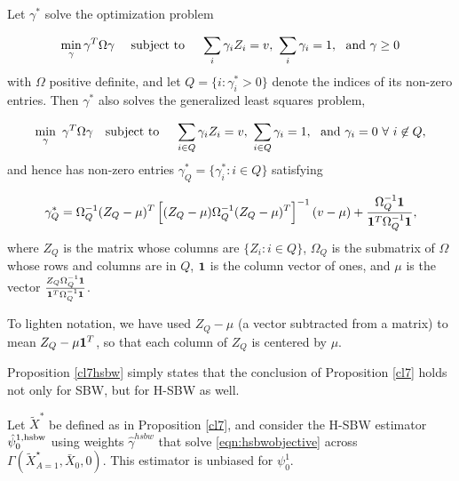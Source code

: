 \begin{proposition}\label{cl56}
Let $\gamma^*$ solve the optimization problem

\begin{equation}\label{eqn:a1.1}
 \min_\gamma \gamma^T \Omega \gamma \quad \text{ subject to } \quad  \sum_i \gamma_i Z_i = v,\ \sum_i \gamma_i = 1,\ \textup{ and } \gamma \geq 0%
\end{equation}
 with $\Omega$ positive definite, and let $Q = \{i: \gamma^*_i > 0\}$ denote the indices of its non-zero entries. Then $\gamma^*$ also solves the generalized least squares problem,
  
  \begin{equation}\label{eqn:a1.2}
   \min_{\gamma}  \ \gamma^T \Omega \gamma  \quad \textup{subject to }\quad \sum_{i \in Q} \gamma_i Z_i = v,\ \sum_{i \in Q} \gamma_i = 1,\ \textup{ and }   \gamma_i = 0\  \forall\ i \not\in Q,
  \end{equation}
 and hence has non-zero entries $\gamma^*_Q = \{\gamma_i^*: i \in Q\}$ satisfying
 
 \begin{equation}\label{eqn:a1.3}
 \gamma^*_{Q} = \Omega_{Q}^{-1} (Z_{Q} - \mu)^T\left[ (Z_Q - \mu) \Omega_{Q}^{-1} (Z_Q - \mu)^T\right]^{-1} (v - \mu) + \frac{\Omega^{-1}_Q {\bf 1} }{{\bf 1}^T \Omega^{-1}_Q {\bf 1}},
 \end{equation}
where $Z_{Q}$ is the matrix whose columns are $\{Z_i: i \in Q\}$, $\Omega_Q$ is the submatrix of $\Omega$ whose rows and columns are in $Q$, ${\bf 1}$ is the column vector of ones, and $\mu$ is the vector $\frac{Z_{Q}\Omega_{Q}^{-1} {\bf 1}}{ {\bf 1}^T \Omega^{-1}_Q {\bf 1}}$. 
\end{proposition}

\begin{remark}
To lighten notation, we have used $Z_Q - \mu$ (a vector subtracted from a matrix) to mean $Z_Q - \mu{\bf 1}^T$, so that each column of $Z_{Q}$ is centered by $\mu$. 
\end{remark}

Proposition \ref{cl7hsbw} simply states that the conclusion of Proposition \ref{cl7} holds not only for SBW, but for H-SBW as well.

\begin{proposition}\label{cl7hsbw}
    Let $\tilde{X}^*$ be defined as in Proposition \ref{cl7}, 
    and consider the H-SBW estimator $\hat{\psi}_0^{1, \textup{hsbw}}$ using weights $\hat{\gamma}^{hsbw}$ that solve \eqref{eqn:hsbwobjective} across $\Gamma(\tilde{X}^\star_{A=1}, \bar{X}_0, 0)$. This estimator is unbiased for $\psi_0^1$.
\end{proposition}

